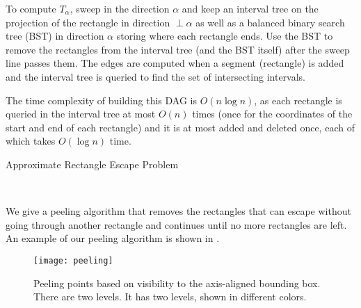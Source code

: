 \documentclass[preprint,12pt]{elsarticle}
\begin{document}
To compute $T_{\alpha}$, sweep in the direction $\alpha$ and keep an interval tree on the projection of the rectangle in direction $\perp \alpha$ as well as a balanced binary search tree (BST) in direction $\alpha$ storing where each rectangle ends. Use the BST to remove the rectangles from the interval tree (and the BST itself) after the sweep line passes them. The edges are computed when a segment (rectangle) is added and the interval tree is queried to find the set of intersecting intervals.

The time complexity of building this DAG is $O(n\log n)$, as each rectangle is queried in the interval tree at most $O(n)$ times (once for the coordinates of the start and end of each rectangle) and it is at most added and deleted once, each of which takes $O(\log n)$ time.

\begin{algorithm}[h]
\caption{Approximate Rectangle Escape Problem}
\label{alg:approx2}
\begin{algorithmic}[1]
\Require {}
\Ensure {}
\EndFor
{}
\EndFor
{}
\EndFor
{}
\EndWhile
\\ 
\end{algorithmic}
\end{algorithm}
%

We give a peeling algorithm that removes the rectangles that can escape without going through another rectangle and continues until no more rectangles are left.
An example of our peeling algorithm is shown in .
\begin{figure}[h]
\centering
\texttt{[image: peeling]}
\caption{Peeling points based on visibility to the axis-aligned bounding box. There are two levels. It has two levels, shown in different colors.}
\label{fig:peeling}
\end{figure}
\end{document}
